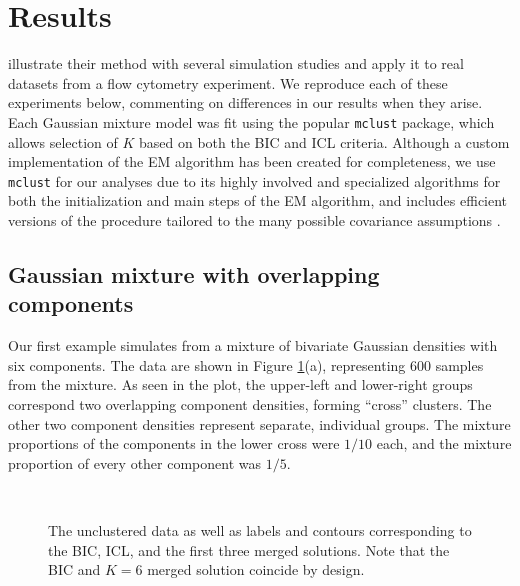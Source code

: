 \documentclass{uwstat572}
\renewcommand\;{\,}
\begin{document}
\section{Results}
\cite{Baudry10} illustrate their method with several simulation studies and apply it to real datasets from a flow cytometry experiment.
We reproduce each of these experiments below, commenting on differences in our results when they arise.
Each Gaussian mixture model was fit using the popular \texttt{mclust} package, which allows selection of $K$ based on both the BIC and ICL criteria.
Although a custom implementation of the EM algorithm has been created for completeness, we use \texttt{mclust} for our analyses due to its highly involved and specialized algorithms for both the initialization and main steps of the EM algorithm, and includes efficient versions of the procedure tailored to the many possible covariance assumptions \citep{Scrucca16, Fraley96}.

\subsection{Gaussian mixture with overlapping components}
Our first example simulates from a mixture of bivariate Gaussian densities with six components.
The data are shown in Figure \ref{Example1}(a), representing 600 samples from the mixture.
As seen in the plot, the upper-left and lower-right groups correspond two overlapping component densities, forming ``cross'' clusters.
The other two component densities represent separate, individual groups.
The mixture proportions of the components in the lower cross were $1/10$ each, and the mixture proportion of every other component was $1/5$. 

\begin{figure}
\begin{center}
\\
\end{center}
\caption{
The unclustered data as well as labels and contours corresponding to the BIC, ICL, and the first three merged solutions. Note that the BIC and $K = 6$ merged solution coincide by design.
}
\label{Example1}
\end{figure}
\end{document}
